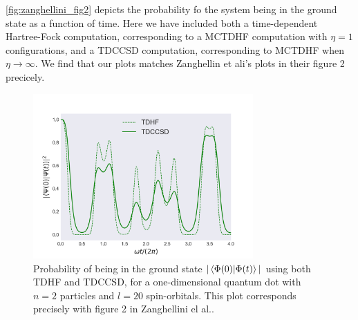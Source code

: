 \autoref{fig:zanghellini_fig2} depicts the probability fo the system being in the ground 
state as a function of time. Here we have included both a time-dependent Hartree-Fock
computation, corresponding to a MCTDHF computation with $\eta=1$ configurations, and 
a TDCCSD computation, corresponding to MCTDHF when $\eta\to\infty$. We find that our plots
matches Zanghellin et ali's plots in their figure 2 precicely. 

\begin{figure}
    \centering
    \includegraphics[width=0.75\textwidth]{results/figures/zanghellini_fig2.png}
    \caption{
        \label{fig:zanghellini_fig2}
        Probability of being in the ground state $|\braket{\Phi(0)}{\Phi(t)}|$
        using both TDHF and TDCCSD, for a one-dimensional quantum dot with $n=2$
        particles and $l=20$ spin-orbitals. This plot corresponds precisely with 
        figure 2 in Zanghellini el al.\cite{Zanghellini04}.
    }           
\end{figure}